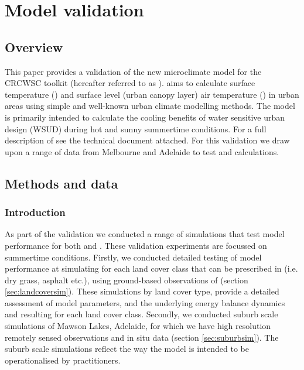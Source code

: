 \documentclass[final,3p,times,authoryear]{elsarticle}
\begin{document}
\section{Model validation}\label{sec:validation}
\subsection{Overview}\label{sec:validationover}



This paper provides a validation of the new microclimate model for the CRCWSC toolkit (hereafter referred to as ).  aims to calculate surface temperature () and surface level (urban canopy layer) air temperature () in urban areas using simple and well-known urban climate modelling methods. The model is primarily intended to calculate the cooling benefits of water sensitive urban design (WSUD) during hot and sunny summertime conditions. For a full description of  see the technical document attached. For this validation we draw upon a range of data from Melbourne and Adelaide to test  and  calculations. 

\subsection{Methods and data}\label{sec:methods}
\subsubsection{Introduction}\label{sec:methodsintro}

As part of the validation we conducted a range of simulations that test model performance for both  and . These validation experiments are focussed on summertime conditions.  Firstly, we conducted detailed testing of model performance at simulating  for each land cover class that can be prescribed in  (i.e. dry grass, asphalt etc.), using ground-based observations of  (section \ref{sec:landcoversim}). These simulations by land cover type, provide a detailed assessment of model parameters, and the underlying energy balance dynamics and resulting  for each land cover class. Secondly, we conducted suburb scale simulations of Mawson Lakes, Adelaide, for which we have high resolution remotely sensed  observations and in situ  data (section \ref{sec:suburbsim}).  The suburb scale simulations reflect the way the model is intended to be operationalised by practitioners.
\end{document}
